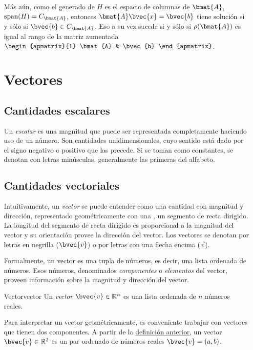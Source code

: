 \documentclass{fmbnotes}
\begin{document}
Más aún, como el generado de \(H\) es el \hyperlink{def:espacio_de_columnas}{espacio de columnas} de \(\bmat{A}\), \(\operatorname{span}(H)=C_{\bmat{A}}\), entonces \(\bmat{A}\bvec{x}=\bvec{b}\) tiene solución si y sólo si \(\bvec{b} \in C_{\bmat{A}}\). Eso a su vez sucede si y sólo si \(\rho(\bmat{A})\) es igual al rango de la matriz aumentada \(\begin{apmatrix}{1}
\bmat{A} & \bvec{b}
\end{apmatrix}\).

\section{Vectores}\label{sec:vectores}

\subsection{Cantidades escalares}

Un \emph{escalar} es una magnitud que puede ser representada completamente haciendo uso de un número. Son cantidades unidimensionales, cuyo sentido está dado por el signo negativo o positivo que las precede. Si se toman como constantes, se denotan con letras minúsculas, generalmente las primeras del alfabeto.

\subsection{Cantidades vectoriales}

Intuitivamente, un \emph{vector} se puede entender como una cantidad con magnitud y dirección, representado geométricamente con una , un segmento de recta dirigido. La longitud del segmento de recta dirigido es proporcional a la magnitud del vector y su orientación provee la dirección del vector. Los vectores se denotan por letras en negrilla (\(\bvec{v}\)) o por letras con una flecha encima (\(\vec{v}\)). 

Formalmente, un vector es una tupla de números, es decir, una lista ordenada de números. Esos números, denominados \emph{componentes} o \emph{elementos} del vector, proveen información sobre la magnitud y dirección del vector. 

\begin{definicion}{Vector}{vector}
Un \emph{vector} \(\bvec{v} \in \mathbb{R}^{n}\) es una lista ordenada de \(n\) números reales.
\end{definicion}

Para interpretar un vector geométricamente, es conveniente trabajar con vectores que tienen dos componentes. A partir de la \hyperlink{def:vector}{definición anterior}, un vector \( \bvec{v} \in \mathbb{R}^{2} \) es un par ordenado de números reales \( \bvec{v}=(a,b) \).
\end{document}
